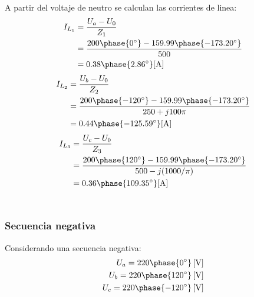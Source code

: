 \documentclass[letter,11pt]{article}
\begin{document}
A partir del voltaje de neutro se calculan las corrientes de linea:
\begin{equation*}
    \begin{split}
        I_{L_1} &= \frac{U_a - U_0}{Z_1}\\
                &= \frac{200\phase{0^{\circ}}-159.99\phase{-173.20^{\circ}}}{500}\\
                &= 0.38\phase{2.86^{\circ}}[\text{A}]\\
    \end{split}
\end{equation*}
\begin{equation*}
    \begin{split}
        I_{L_2} &= \frac{U_b - U_0}{Z_2}\\
                &= \frac{200\phase{-120^{\circ}}-159.99\phase{-173.20^{\circ}}}{250+j100\pi}\\
                &= 0.44\phase{-125.59^{\circ}}[\text{A}]\\
    \end{split}
\end{equation*}
\begin{equation*}
    \begin{split}
        I_{L_3} &= \frac{U_c - U_0}{Z_3}\\
                &= \frac{200\phase{120^{\circ}}-159.99\phase{-173.20^{\circ}}}{500-j(1000/\pi)}\\
                &= 0.36\phase{109.35^{\circ}}[\text{A}]\\
    \end{split}
\end{equation*}
\\

\subsubsection{Secuencia negativa}
Considerando una secuencia negativa:
\begin{equation*}
    \begin{split}
        U_a = 220\phase{0^{\circ}}\,[\text{V}]\\
        U_b = 220\phase{120^{\circ}}\,[\text{V}]\\
        U_c = 220\phase{-120^{\circ}}\,[\text{V}]\\
    \end{split}
\end{equation*}
\end{document}
